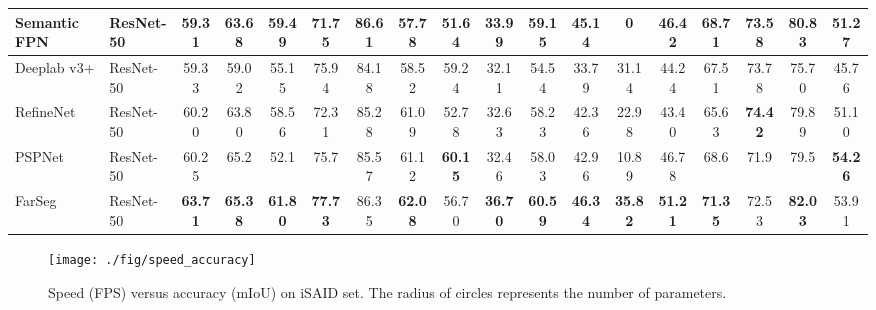 \documentclass[10pt,twocolumn,letterpaper]{article}
\begin{document}
\begin{table*}[hbt]
{\begin{tabular}{l|l|c|ccccccccccccccc}
         Semantic FPN \cite{kirillov2019panoptic}    & ResNet-50                 & 59.31                      & 63.68                                      & 59.49          & 71.75          & \textbf{86.61} & 57.78          & 51.64          & 33.99          & 59.15          & 45.14          & 0              & 46.42          & 68.71          & 73.58          & 80.83          & 51.27          \\ \hline
         Deeplab v3+ \cite{chen2018encoder}   & ResNet-50                 & 59.33                      & 59.02                                      & 55.15          & 75.94          & 84.18          & 58.52          & 59.24          & 32.11          & 54.54          & 33.79          & 31.14          & 44.24          & 67.51          & 73.78          & 75.70          & 45.76          \\ \hline
         RefineNet \cite{lin2017refinenet}    & ResNet-50                 & 60.20                      & 63.80                                      & 58.56          & 72.31          & 85.28          & 61.09          & 52.78          & 32.63          & 58.23          & 42.36          & 22.98          & 43.40          & 65.63          & \textbf{74.42} & 79.89          & 51.10          \\ \hline
         PSPNet \cite{zhao2017pyramid}        & ResNet-50                 & 60.25                      & 65.2                                       & 52.1           & 75.7           & 85.57          & 61.12          & \textbf{60.15} & 32.46          & 58.03          & 42.96          & 10.89          & 46.78          & 68.6           & 71.9           & 79.5           & \textbf{54.26} \\ \hline\hline
         FarSeg                               & ResNet-50                 & \textbf{63.71}             & \textbf{65.38}                             & \textbf{61.80} & \textbf{77.73} & 86.35          & \textbf{62.08} & 56.70          & \textbf{36.70} & \textbf{60.59} & \textbf{46.34} & \textbf{35.82} & \textbf{51.21} & \textbf{71.35} & 72.53          & \textbf{82.03} & 53.91          \\ \hline
      \end{tabular}
   }
\end{table*}


\begin{figure}[hbt]
   \begin{center}
      \texttt{[image: ./fig/speed\_accuracy]}
   \end{center}
   \caption{Speed (FPS) versus accuracy (mIoU) on iSAID  set. The radius of circles represents the number of parameters.}
   \label{fig:speed_accuracy}
\end{figure}
\end{document}
